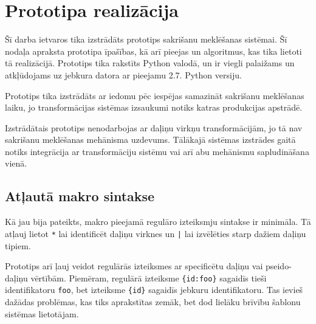 \section{Prototipa realizācija}
\label{s:prototype}

Šī darba ietvaros tika izstrādāts prototips sakrišanu meklēšanas sistēmai. Šī nodaļa apraksta prototipa īpašības, kā arī pieejas un algoritmus, kas tika lietoti tā realizācijā. Prototips tika rakstīts Python valodā, un ir viegli palaižams un atkļūdojams uz jebkura datora ar pieejamu 2.7. Python versiju.

Prototips tika izstrādāts ar iedomu pēc iespējas samazināt sakrišanu meklēšanas laiku, jo transformācijas sistēmas izsaukumi notiks katras produkcijas apstrādē.

Izstrādātais prototips nenodarbojas ar daļiņu virkņu transformācijām, jo tā nav sakrišanu meklēšanas mehānisma uzdevums. Tālākajā sistēmas izstrādes gaitā notiks integrācija ar transformāciju sistēmu vai arī abu mehānismu sapludināšana vienā.


\subsection{\label{sbs:prot_syntax}Atļautā makro sintakse}

Kā jau bija pateikts, makro pieejamā regulāro izteiksmju sintakse ir minimāla. Tā atļauj lietot \verb|*| lai identificēt daļiņu virknes un \verb/|/ lai izvēlēties starp dažiem daļiņu tipiem.

Prototips arī ļauj veidot regulārās izteiksmes ar specificētu daļiņu vai pseido-daļiņu vērtībām. Piemēram, regulārā izteiksme \verb|{id:foo}| sagaidīs tieši identifikatoru \verb|foo|, bet izteiksme \verb|{id}| sagaidīs jebkuru identifikatoru. Tas ievieš dažādas problēmas, kas tiks aprakstītas zemāk, bet dod lielāku brīvību šablonu sistēmas lietotājam.

